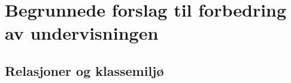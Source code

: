 \documentclass[12pt,a4paper]{article}
\begin{document}

%
%
%

\section{Begrunnede forslag til forbedring av undervisningen}
\label{sec:forbedringer}

\subsection{Relasjoner og klassemiljø}

\end{document}
